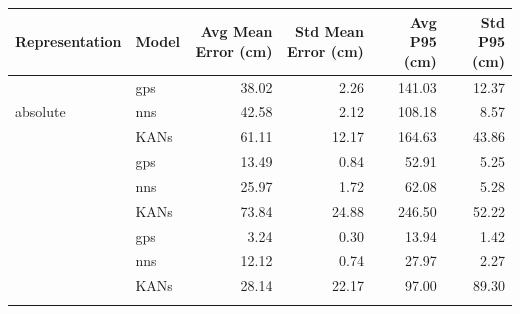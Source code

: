 
\begin{tabular}{llrrrr}
\toprule
Representation & Model & Avg Mean Error (cm) & Std Mean Error (cm) & Avg P95 (cm) & Std P95 (cm) \\
\midrule

\multirow{3}{*}{absolute} & gps & 38.02 & 2.26 & 141.03 & 12.37 \\
 & nns & 42.58 & 2.12 & 108.18 & 8.57 \\
 & KANs & 61.11 & 12.17 & 164.63 & 43.86 \\
\addlinespace
\multirow{3}{*}{relative} & gps & 13.49 & 0.84 & 52.91 & 5.25 \\
 & nns & 25.97 & 1.72 & 62.08 & 5.28 \\
 & KANs & 73.84 & 24.88 & 246.50 & 52.22 \\
\addlinespace
\multirow{3}{*}{log_d} & gps & 3.24 & 0.30 & 13.94 & 1.42 \\
 & nns & 12.12 & 0.74 & 27.97 & 2.27 \\
 & KANs & 28.14 & 22.17 & 97.00 & 89.30 \\
\addlinespace

\bottomrule
\end{tabular}
